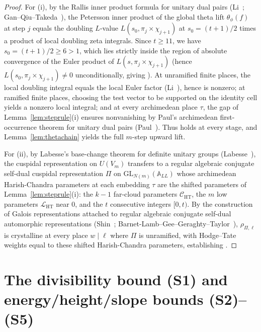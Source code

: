 \documentclass[11pt]{amsart}
\theoremstyle{plain}
\theoremstyle{definition}
\numberwithin{equation}{section}
\begin{document}
\begin{proof}
For (i), by the Rallis inner product formula for unitary dual pairs
(Li~\cite[Thm.~3.2]{li-theta}; Gan--Qiu--Takeda~\cite[Thm.~1.1, Thm.~7.2]{gan-qiu-takeda}), the
Petersson inner product of the global theta lift $\theta_\phi(f)$ at step $j$ equals the doubling
$L$-value $L(s_0,\pi_j\times\chi_{j+1})$ at $s_0=(t+1)/2$ times a product of local doubling zeta
integrals. Since $t\ge 11$, we have $s_0=(t+1)/2\ge 6>1$, which lies strictly inside the region
of absolute convergence of the Euler product of $L(s,\pi_j\times\chi_{j+1})$ (hence
$L(s_0,\pi_j\times\chi_{j+1})\neq 0$ unconditionally, giving ). At unramified
finite places, the local doubling integral equals the local Euler factor
(Li~\cite[Prop.~3.1]{li-theta}), hence is nonzero; at ramified finite places, choosing the test
vector to be supported on the identity cell yields a nonzero local integral; and at every
archimedean place $\tau$, the  gap of Lemma~\ref{lem:steprule}(i) ensures
nonvanishing by Paul's archimedean first-occurrence theorem for unitary dual pairs
(Paul~\cite[Thm.~6.1]{paul-unitary}). Thus  holds at every stage, and
Lemma~\ref{lem:thetachain} yields the full $m$-step upward lift.

For (ii), by Labesse's base-change theorem for definite unitary groups
(Labesse~\cite[Thm.~5.4]{labesse}), the cuspidal representation on $U(V_m)$ transfers to a regular
algebraic conjugate self-dual cuspidal representation $\Pi$ on $\mathrm{GL}_{N(m)}(\mathbb A_{LL})$
whose archimedean Harish-Chandra parameters at each embedding $\tau$ are the shifted parameters of
Lemma~\ref{lem:steprule}(i): the $k-1$ far-cloud parameters $\mathcal C_{\mathrm{HT}}$, the $m$
low parameters $\mathcal L_{\mathrm{HT}}$ near $0$, and the $t$ consecutive integers $[0,t)$. By
the construction of Galois representations attached to regular algebraic conjugate self-dual
automorphic representations (Shin~\cite[Thm.~1.2]{shin-galois};
Barnet-Lamb--Gee--Geraghty--Taylor~\cite[Thm.~2.1.1]{blggt}), $\rho_{\Pi,\ell}$ is crystalline at
every place $w\mid\ell$ where $\Pi$ is unramified, with Hodge--Tate weights equal to these shifted
Harish-Chandra parameters, establishing .
\end{proof}

\section{The divisibility bound (S1) and energy/height/slope bounds (S2)--(S5)}\label{sec:S1S5}
\end{document}
